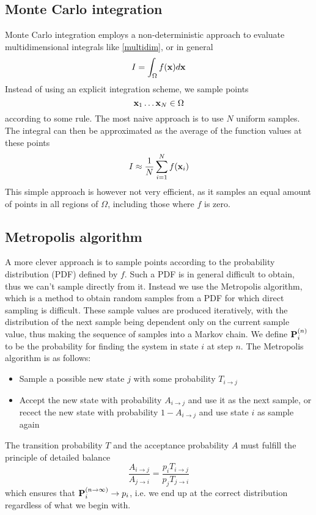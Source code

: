 \documentclass[english, a4paper]{article}
\begin{document}
\subsection{Monte Carlo integration}

Monte Carlo integration employs a non-deterministic approach to evaluate multidimensional integrals like 
\eqref{multidim}, or in general
\begin{equation}
 I = \int_\Omega f({\bf x}) d{\bf x}
\end{equation}
Instead of using an explicit integration scheme, we sample points
\begin{equation}
 {\bf x}_1 \dots {\bf x}_N \in \Omega
\end{equation}
according to some rule. The most naive approach is to use $N$ uniform samples. 
The integral can then be approximated as the average of the function values at these points
\begin{equation}
 I \approx \frac{1}{N} \sum_{i=1}^N f({\bf x}_i)
\end{equation}
This simple approach is however not very efficient, as it samples an equal amount of points in all regions of $\Omega$, 
including those where $f$ is zero. 

\subsection{Metropolis algorithm}

A more clever approach is to sample points according to the probability distribution (PDF)
defined by $f$. Such a PDF is in general difficult to obtain, thus we can't sample directly from it.
Instead we use the Metropolis algorithm, which is a method to obtain random samples from a PDF for which 
direct sampling is difficult. 
These sample values are produced iteratively, with the distribution of the next sample being dependent only on 
the current sample value, thus making the sequence of samples into a Markov chain.
We define ${\bf P}_i^{(n)}$ to be the 
probability for finding the system in state $i$ at step $n$. 
The Metropolis algorithm is as follows:
\begin{itemize}
 \item Sample a possible new state $j$ with some probability $T_{i\rightarrow j}$
 \item Accept the new state with probability $A_{i\rightarrow j}$ and use it as the next sample, or
 recect the new state with probability $1 - A_{i\rightarrow j}$ and use state $i$ as sample again
\end{itemize}
The transition probability $T$ and the acceptance probability $A$ must fulfill the principle of detailed balance
\begin{equation}
 \frac{A_{i\rightarrow j}}{A_{j\rightarrow i}} = \frac{p_i T_{i\rightarrow j}}{p_j T_{j\rightarrow i}}
 \label{detailedbalance}
\end{equation}
which ensures that ${\bf P}_i^{(n\rightarrow \infty)} \rightarrow p_i$, i.e. we end up at the correct 
distribution regardless of what we begin with. \\
\end{document}
